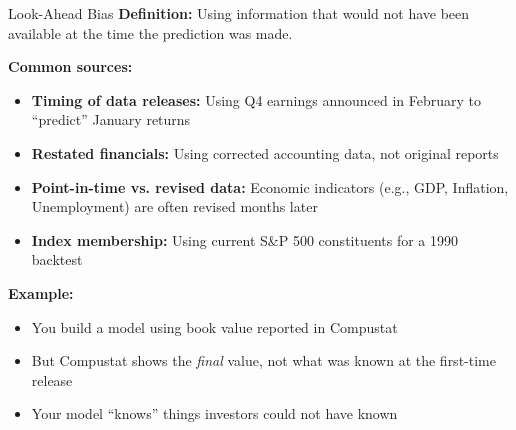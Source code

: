 \documentclass[10pt]{beamer}
\newcommand{\highlight}[1]{\textcolor{AccentOrange}{\textbf{#1}}}
\begin{document}
\begin{frame}{Look-Ahead Bias}
  \textbf{Definition:} Using information that would not have been available at the time the prediction was made.
  
  \vspace{1em}
  \textbf{Common sources:}
  \begin{itemize}
    \item \highlight{Timing of data releases:} Using Q4 earnings announced in February to ``predict'' January returns
    \item \highlight{Restated financials:} Using corrected accounting data, not original reports
    \item \highlight{Point-in-time vs. revised data:} Economic indicators (e.g., GDP, Inflation, Unemployment) are often revised months later
    \item \highlight{Index membership:} Using current S\&P 500 constituents for a 1990 backtest
  \end{itemize}
  
  \vspace{1em}
  \textbf{Example:}
  \begin{itemize}
    \item You build a model using book value reported in Compustat
    \item But Compustat shows the \emph{final} value, not what was known at the first-time release
    \item Your model ``knows'' things investors could not have known
  \end{itemize}
\end{frame}
\end{document}
